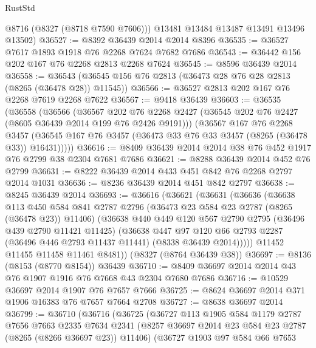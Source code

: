\begin{lexlean}{RustStd}
\begin{coremodule}
{\begin{coremodule}
{{{{{{{{{{{{{{{{{{{{{{{{{{{{{{{{{{{{{{{{{{{{{{{{{{{{{{        @8716
        (@8327 (@8718 @7590 @7606)))
      @13481
      @13484
      @13487
      @13491
      @13496
      @13502)
@36527 := @8392 @36439 @2014 @2014 @8396
@36535 := @36527 @7617 @1893 @1918 @76 @2268 @7624 @7682 @7686
@36543 := @36442 @156 @202 @167 @76 @2268 @2813 @2268 @7624
@36545 := @8596 @36439 @2014
@36558 := @36543 (@36545 @156 @76 @2813 (@36473 @28 @76 @28 @2813 (@8265 (@36478 @28)) @11545))
@36566 := @36527 @2813 @202 @167 @76 @2268 @7619 @2268 @7622
@36567 := @9418 @36439
@36603 := @36535
    (@36558
      (@36566
        (@36567
          @202
          @76
          @2268
          @2427
          (@36545 @202 @76 @2427 (@8605 @36439 @2014 @199 @76 @2426 @9191)))
        (@36567
          @167
          @76
          @2268
          @3457
          (@36545 @167 @76 @3457 (@36473 @33 @76 @33 @3457 (@8265 (@36478 @33)) @16431)))))
@36616 := @8409 @36439 @2014 @2014 @38 @76 @452 @1917 @76 @2799 @38 @2304 @7681 @7686
@36621 := @8288 @36439 @2014 @452 @76 @2799
@36631 := @8222 @36439 @2014 @433 @451 @842 @76 @2268 @2797 @2014 @1031
@36636 := @8236 @36439 @2014 @451 @842 @2797
@36638 := @8245 @36439 @2014
@36693 := @36616
    (@36621
      (@36631
        (@36636
          (@36638
            @113
            @450
            @584
            @841
            @2787
            @2796
            (@36473 @23 @584 @23 @2787 (@8265 (@36478 @23)) @11406)
            (@36638
              @440
              @449
              @120
              @567
              @2790
              @2795
              (@36496 @439 @2790 @11421 @11425)
              (@36638
                @447
                @97
                @120
                @66
                @2793
                @2287
                (@36496 @446 @2793 @11437 @11441)
                (@8338 @36439 @2014)))))
        @11452
        @11455
        @11458
        @11461
        @8481))
    (@8327 (@8764 @36439 @38))
@36697 := @8136 (@8153 (@8770 @8154)) @36439
@36710 := @8409 @36697 @2014 @2014 @43 @76 @1907 @1916 @76 @7668 @43 @2304 @7680 @7686
@36716 := @10529 @36697 @2014 @1907 @76 @7657 @7666
@36725 := @8624 @36697 @2014 @371 @1906 @16383 @76 @7657 @7664 @2708
@36727 := @8638 @36697 @2014
@36799 := @36710
    (@36716
      (@36725
        (@36727
          @113
          @1905
          @584
          @1179
          @2787
          @7656
          @7663
          @2335
          @7634
          @2341
          (@8257 @36697 @2014 @23 @584 @23 @2787 (@8265 (@8266 @36697 @23)) @11406)
          (@36727
            @1903
            @97
            @584
            @66
            @7653
}}}}}}}}}}}}}}}}}}}}}}}}}}}}}}}}}}}}}}}}}}}}}}}}}}}}}}
\end{coremodule}}
\end{coremodule}
\end{lexlean}
